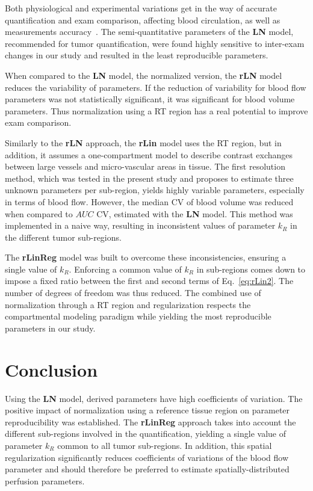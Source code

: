 Both physiological and experimental variations get in the way of accurate quantification and exam comparison, affecting blood circulation, as well as measurements accuracy~\cite{Tang:2011fja}.
The semi-quantitative parameters of the \textbf{LN} model, recommended for tumor quantification, were found highly sensitive to inter-exam changes in our study and resulted in the least reproducible parameters. 
 
When compared to the \textbf{LN} model, the normalized version, the \textbf{rLN} model reduces the variability of parameters. If the reduction of variability for blood flow parameters was not statistically significant, it was significant for blood volume parameters. Thus normalization using a RT region has a real potential to improve exam comparison.

Similarly to the \textbf{rLN} approach, the \textbf{rLin} model uses the RT region, but in addition, it assumes a one-compartment model to describe contrast exchanges between large vessels and micro-vascular areas in tissue.
The first resolution method, which was tested in the present study and proposes to estimate three unknown parameters per sub-region, yields highly variable parameters, especially in terms of blood flow. However, the median CV of blood volume was  reduced when compared to  $AUC$ CV, estimated with the \textbf{LN} model.
This method was implemented in a naive way, resulting in inconsistent values of parameter $k_R$ in the different tumor sub-regions. 

The \textbf{rLinReg} model was built to overcome these inconsistencies, ensuring a single value of $k_R$.
Enforcing a common value of $k_R$ in sub-regions comes down to impose a fixed ratio between the first and second terms of Eq.~\ref{eq:rLin2}.
The number of degrees of freedom was thus reduced. 
The combined use of normalization through a RT region and regularization respects the compartmental modeling paradigm while yielding the most reproducible parameters in our study.

\section{Conclusion}

Using the \textbf{LN} model, derived parameters have high coefficients of variation. 
The positive impact of normalization using a reference tissue region on parameter reproducibility was established. 
The \textbf{rLinReg} approach takes into account the different sub-regions involved in the quantification, yielding a single value of parameter $k_R$ common to all tumor sub-regions. 
In addition, this spatial regularization significantly reduces coefficients of variations of the blood flow parameter and should therefore be preferred to estimate spatially-distributed perfusion parameters.


